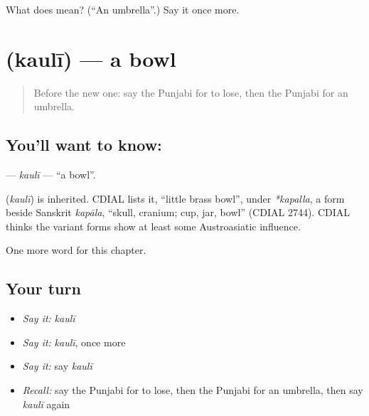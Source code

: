 \begin{tcolorbox}[breakable,colback=teal!4,colframe=teal!35!black,title={Before you move on}]
What does  mean? (\textquotedblleft{}An umbrella\textquotedblright{}.) Say it once more.
\end{tcolorbox}
\section[\texorpdfstring{\pa{ਕੌਲੀ} (kaulī)}{ਕੌਲੀ (kaulī)}]{ (kaulī) — a bowl}

\label{lesson:PA-C113-kauli}



\begin{quote}
Before the new one: say the Punjabi for to lose, then the Punjabi for an umbrella.
\end{quote}

\subsection*{You'll want to know: }
\textbf{} — \emph{kaulī} — \textquotedblleft{}a bowl\textquotedblright{}.

\begin{cousinweb}
\textbf{} (\emph{kaulī}) is inherited. CDIAL lists it, \textquotedblleft{}little brass bowl\textquotedblright{}, under \emph{*kapalla}, a form beside Sanskrit \emph{kapāla}, \textquotedblleft{}skull, cranium; cup, jar, bowl\textquotedblright{} (CDIAL 2744). CDIAL thinks the variant forms show at least some Austroasiatic influence.
\end{cousinweb}

\begin{grammarlens}[title={What you've built}]
One more word for this chapter.
\end{grammarlens}

\subsection*{Your turn}
\begin{itemize}
\raggedright
  \item \emph{Say it:} \emph{kaulī}
  \item \emph{Say it:} \emph{kaulī}, once more
  \item \emph{Say it:} say \emph{kaulī}
  \item \emph{Recall:} say the Punjabi for to lose, then the Punjabi for an umbrella, then say \emph{kaulī} again
\end{itemize}

